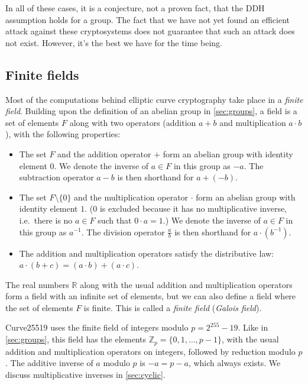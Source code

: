 \documentclass[manuscript]{acmart}
\begin{document}
In all of these cases, it is a conjecture, not a proven fact, that the DDH assumption holds for a group.
The fact that we have not yet found an efficient attack against these cryptosystems does not guarantee that such an attack does not exist.
However, it's the best we have for the time being.


\subsection{Finite fields}\label{sec:fields}

Most of the computations behind elliptic curve cryptography take place in a \emph{finite field}.
Building upon the definition of an abelian group in \autoref{sec:groups}, a field is a set of elements $F$ along with two operators (addition $a + b$ and multiplication $a \cdot b$), with the following properties:
\begin{itemize}
    \item The set $F$ and the addition operator $+$ form an abelian group with identity element $0$.
        We denote the inverse of $a \in F$ in this group as $-a$.
        The subtraction operator $a - b$ is then shorthand for $a + (-b)$.
    \item The set $F \setminus \{0\}$ and the multiplication operator $\cdot$ form an abelian group with identity element $1$.
        (0 is excluded because it has no multiplicative inverse, i.e.\ there is no $a \in F$ such that $0 \cdot a = 1$.)
        We denote the inverse of $a \in F$ in this group as $a^{-1}$.
        The division operator $\frac{a}{b}$ is then shorthand for $a \cdot (b^{-1})$.
    \item The addition and multiplication operators satisfy the distributive law: $a \cdot (b + c) = (a \cdot b) + (a \cdot c)$.
\end{itemize}
The real numbers $\mathbb{R}$ along with the usual addition and multiplication operators form a field with an infinite set of elements, but we can also define a field where the set of elements $F$ is finite.
This is called a \emph{finite field} (\emph{Galois field}).

Curve25519 uses the finite field of integers modulo $p = 2^{255}-19$.
Like in \autoref{sec:groups}, this field has the elements $\mathbb{Z}_p = \{0, 1, \dots, p-1\}$, with the usual addition and multiplication operators on integers, followed by reduction modulo $p$.
The additive inverse of $a$ modulo $p$ is $-a = p - a$, which always exists.
We discuss multiplicative inverses in \autoref{sec:cyclic}.
\end{document}

